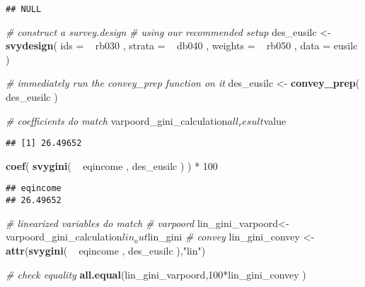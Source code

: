 \documentclass[]{book}
\newenvironment{Shaded}{\begin{snugshade}}{\end{snugshade}}
\newcommand{\KeywordTok}[1]{\textcolor[rgb]{0.13,0.29,0.53}{\textbf{{#1}}}}
\newcommand{\DataTypeTok}[1]{\textcolor[rgb]{0.13,0.29,0.53}{{#1}}}
\newcommand{\DecValTok}[1]{\textcolor[rgb]{0.00,0.00,0.81}{{#1}}}
\newcommand{\StringTok}[1]{\textcolor[rgb]{0.31,0.60,0.02}{{#1}}}
\newcommand{\CommentTok}[1]{\textcolor[rgb]{0.56,0.35,0.01}{\textit{{#1}}}}
\newcommand{\NormalTok}[1]{{#1}}
\begin{document}
\begin{verbatim}
## NULL
\end{verbatim}

\begin{Shaded}
\begin{Highlighting}[]
\CommentTok{# construct a survey.design}
\CommentTok{# using our recommended setup}
\NormalTok{des_eusilc <-}\StringTok{ }
\StringTok{    }\KeywordTok{svydesign}\NormalTok{( }
        \DataTypeTok{ids =} \NormalTok{~}\StringTok{ }\NormalTok{rb030 , }
        \DataTypeTok{strata =} \NormalTok{~}\StringTok{ }\NormalTok{db040 ,  }
        \DataTypeTok{weights =} \NormalTok{~}\StringTok{ }\NormalTok{rb050 , }
        \DataTypeTok{data =} \NormalTok{eusilc}
    \NormalTok{)}

\CommentTok{# immediately run the convey_prep function on it}
\NormalTok{des_eusilc <-}\StringTok{ }\KeywordTok{convey_prep}\NormalTok{( des_eusilc )}

\CommentTok{# coefficients do match}
\NormalTok{varpoord_gini_calculation$all_result$value}
\end{Highlighting}
\end{Shaded}

\begin{verbatim}
## [1] 26.49652
\end{verbatim}

\begin{Shaded}
\begin{Highlighting}[]
\KeywordTok{coef}\NormalTok{( }\KeywordTok{svygini}\NormalTok{( ~}\StringTok{ }\NormalTok{eqincome , des_eusilc ) ) *}\StringTok{ }\DecValTok{100}
\end{Highlighting}
\end{Shaded}

\begin{verbatim}
## eqincome 
## 26.49652
\end{verbatim}

\begin{Shaded}
\begin{Highlighting}[]
\CommentTok{# linearized variables do match}
\CommentTok{# varpoord}
\NormalTok{lin_gini_varpoord<-}\StringTok{ }\NormalTok{varpoord_gini_calculation$lin_out$lin_gini}
\CommentTok{# convey }
\NormalTok{lin_gini_convey <-}\StringTok{ }\KeywordTok{attr}\NormalTok{(}\KeywordTok{svygini}\NormalTok{( ~}\StringTok{ }\NormalTok{eqincome , des_eusilc ),}\StringTok{"lin"}\NormalTok{)}

\CommentTok{# check equality}
\KeywordTok{all.equal}\NormalTok{(lin_gini_varpoord,}\DecValTok{100}\NormalTok{*lin_gini_convey )}
\end{Highlighting}
\end{Shaded}
\end{document}
